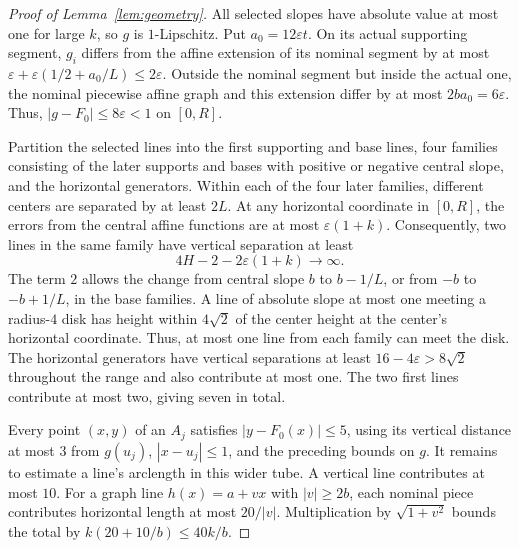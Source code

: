 \documentclass[11pt,letterpaper]{article}
\begin{document}
\begin{proof}[Proof of Lemma~\ref{lem:geometry}]
All selected slopes have absolute value at most one for large $k$, so $g$ is $1$-Lipschitz. Put $a_0=12\varepsilon t$. On its actual supporting segment, $g_i$ differs from the affine extension of its nominal segment by at most $\varepsilon+\varepsilon(1/2+a_0/L)\le2\varepsilon$. Outside the nominal segment but inside the actual one, the nominal piecewise affine graph and this extension differ by at most $2ba_0=6\varepsilon$. Thus, $|g-F_0|\le8\varepsilon<1$ on $[0,R]$.

Partition the selected lines into the first supporting and base lines, four families consisting of the later supports and bases with positive or negative central slope, and the horizontal generators. Within each of the four later families, different centers are separated by at least $2L$. At any horizontal coordinate in $[0,R]$, the errors from the central affine functions are at most $\varepsilon(1+k)$. Consequently, two lines in the same family have vertical separation at least
\[
 4H-2-2\varepsilon(1+k)\longrightarrow\infty.
\]
The term $2$ allows the change from central slope $b$ to $b-1/L$, or from $-b$ to $-b+1/L$, in the base families. A line of absolute slope at most one meeting a radius-$4$ disk has height within $4\sqrt2$ of the center height at the center's horizontal coordinate. Thus, at most one line from each family can meet the disk. The horizontal generators have vertical separations at least $16-4\varepsilon>8\sqrt2$ throughout the range and also contribute at most one. The two first lines contribute at most two, giving seven in total.

Every point $(x,y)$ of an $A_j$ satisfies $|y-F_0(x)|\le5$, using its vertical distance at most $3$ from $g(u_j)$, $|x-u_j|\le1$, and the preceding bounds on $g$. It remains to estimate a line's arclength in this wider tube. A vertical line contributes at most $10$. For a graph line $h(x)=a+vx$ with $|v|\ge2b$, each nominal piece contributes horizontal length at most $20/|v|$. Multiplication by $\sqrt{1+v^2}$ bounds the total by $k(20+10/b)\le40k/b$.


\end{proof}
\end{document}
